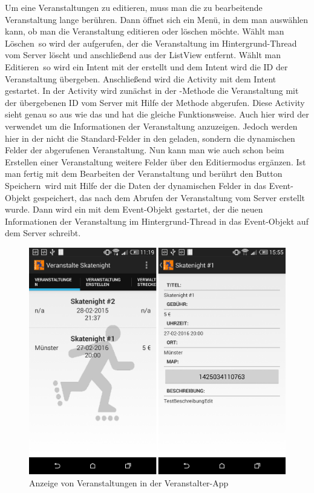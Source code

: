 Um eine Veranstaltungen zu editieren, muss man die zu bearbeitende Veranstaltung lange berühren. Dann öffnet sich ein Menü, in dem man auswählen kann, ob man die Veranstaltung editieren oder löschen möchte. Wählt man \glqq Löschen\grqq\ so wird der  aufgerufen, der die Veranstaltung im Hintergrund-Thread vom Server löscht und anschließend aus der ListView entfernt. Wählt man \glqq Editieren\grqq\ so wird ein Intent mit der  erstellt und dem Intent wird die ID der Veranstaltung übergeben. Anschließend wird die Activity mit dem Intent gestartet. In der Activity wird zunächst in der -Methode die Veranstaltung mit der übergebenen ID vom Server  mit Hilfe der  Methode abgerufen. Diese Activity sieht genau so aus wie das  und hat die gleiche Funktionsweise. Auch hier wird der  verwendet um die Informationen der Veranstaltung anzuzeigen. Jedoch werden hier in der  nicht die Standard-Felder in den  geladen, sondern die dynamischen Felder der abgerufenen Veranstaltung. Nun kann man wie auch schon beim Erstellen einer Veranstaltung weitere Felder über den Editiermodus ergänzen. Ist man fertig mit dem Bearbeiten der Veranstaltung und berührt den Button \glqq Speichern\grqq\ wird mit Hilfe der  die Daten der dynamischen Felder in das Event-Objekt gespeichert, das nach dem Abrufen der Veranstaltung vom Server erstellt wurde. Dann wird ein  mit dem Event-Objekt gestartet, der die neuen Informationen der Veranstaltung im Hintergrund-Thread in das Event-Objekt auf dem Server schreibt.

\begin{figure}[htb]
\centering
\includegraphics[width=12 cm]{graphics/show_events_veranstalter_app.png}
\caption{Anzeige von Veranstaltungen in der Veranstalter-App}
\label{fig:VeranstaltungAnzeigenVeranstalterapp}
\end{figure}

